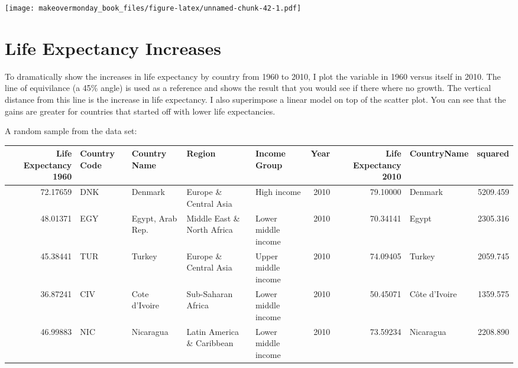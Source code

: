 \documentclass[]{book}
\theoremstyle{definition}
\theoremstyle{definition}
\theoremstyle{definition}
\theoremstyle{remark}
\begin{document}
\texttt{[image: makeovermonday\_book\_files/figure-latex/unnamed-chunk-42-1.pdf]}

\chapter{Life Expectancy Increases}\label{life-expectancy-increases}

To dramatically show the increases in life expectancy by country from
1960 to 2010, I plot the variable in 1960 versus itself in 2010. The
line of equivilance (a 45\% angle) is used as a reference and shows the
result that you would see if there where no growth. The vertical
distance from this line is the increase in life expectancy. I also
superimpose a linear model on top of the scatter plot. You can see that
the gains are greater for countries that started off with lower life
expectancies.

A random sample from the data set:

\begin{tabular}{r|l|l|l|l|r|r|l|r}
\hline
Life Expectancy 1960 & Country Code & Country Name & Region & Income Group & Year & Life Expectancy 2010 & CountryName & squared\\
\hline
72.17659 & DNK & Denmark & Europe \& Central Asia & High income & 2010 & 79.10000 & Denmark & 5209.459\\
\hline
48.01371 & EGY & Egypt, Arab Rep. & Middle East \& North Africa & Lower middle income & 2010 & 70.34141 & Egypt & 2305.316\\
\hline
45.38441 & TUR & Turkey & Europe \& Central Asia & Upper middle income & 2010 & 74.09405 & Turkey & 2059.745\\
\hline
36.87241 & CIV & Cote d'Ivoire & Sub-Saharan Africa & Lower middle income & 2010 & 50.45071 & Côte d’Ivoire & 1359.575\\
\hline
46.99883 & NIC & Nicaragua & Latin America \& Caribbean & Lower middle income & 2010 & 73.59234 & Nicaragua & 2208.890\\
\hline
\end{tabular}
\end{document}
